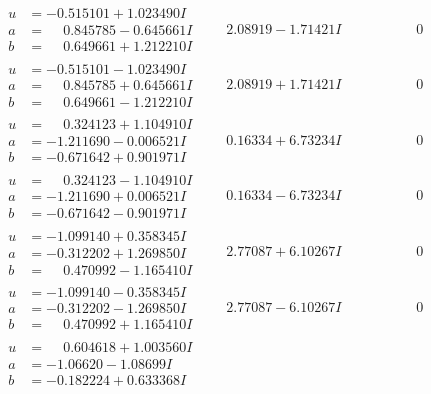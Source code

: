 \documentclass[1p]{elsarticle_modified}
\theoremstyle{definition}
\begin{document}
$$\begin{array}{c|c|c}
\begin{aligned}
u &= -0.515101 + 1.023490 I \\
a &= \phantom{-}0.845785 - 0.645661 I \\
b &= \phantom{-}0.649661 + 1.212210 I\end{aligned}
 & \phantom{-}2.08919 - 1.71421 I & \phantom{-0.000000 } 0 \\ \hline\begin{aligned}
u &= -0.515101 - 1.023490 I \\
a &= \phantom{-}0.845785 + 0.645661 I \\
b &= \phantom{-}0.649661 - 1.212210 I\end{aligned}
 & \phantom{-}2.08919 + 1.71421 I & \phantom{-0.000000 } 0 \\ \hline\begin{aligned}
u &= \phantom{-}0.324123 + 1.104910 I \\
a &= -1.211690 - 0.006521 I \\
b &= -0.671642 + 0.901971 I\end{aligned}
 & \phantom{-}0.16334 + 6.73234 I & \phantom{-0.000000 } 0 \\ \hline\begin{aligned}
u &= \phantom{-}0.324123 - 1.104910 I \\
a &= -1.211690 + 0.006521 I \\
b &= -0.671642 - 0.901971 I\end{aligned}
 & \phantom{-}0.16334 - 6.73234 I & \phantom{-0.000000 } 0 \\ \hline\begin{aligned}
u &= -1.099140 + 0.358345 I \\
a &= -0.312202 + 1.269850 I \\
b &= \phantom{-}0.470992 - 1.165410 I\end{aligned}
 & \phantom{-}2.77087 + 6.10267 I & \phantom{-0.000000 } 0 \\ \hline\begin{aligned}
u &= -1.099140 - 0.358345 I \\
a &= -0.312202 - 1.269850 I \\
b &= \phantom{-}0.470992 + 1.165410 I\end{aligned}
 & \phantom{-}2.77087 - 6.10267 I & \phantom{-0.000000 } 0 \\ \hline\begin{aligned}
u &= \phantom{-}0.604618 + 1.003560 I \\
a &= -1.06620 - 1.08699 I \\
b &= -0.182224 + 0.633368 I\end{aligned}

\end{array}$$
\end{document}
